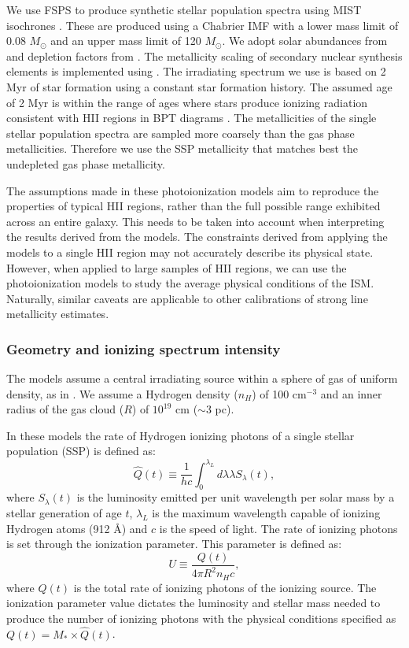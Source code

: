\documentclass[fleqn,usenatbib]{mnras}
\begin{document}
We use FSPS to produce synthetic stellar population spectra \citep{conroy2009,conroy2010} using MIST isochrones \citep{choi2016}. These are produced using a Chabrier IMF \citep{chabrier2003} with a lower mass limit of 0.08 $M_\odot$ and an upper mass limit of 120 $M_\odot$. We adopt solar abundances from \cite{grevesse2010} and depletion factors from \cite{dopita2013}. The metallicity scaling of secondary nuclear synthesis elements is implemented using \cite{vanzee1998}. The irradiating spectrum we use is based on 2 Myr of star formation using a constant star formation history. The assumed age of 2 Myr is within the range of ages where stars produce ionizing radiation consistent with HII regions in BPT diagrams \citep{byler2017}. The metallicities of the single stellar population spectra are sampled more coarsely than the gas phase metallicities. Therefore we use the SSP metallicity that matches best the undepleted gas phase metallicity.

The assumptions made in these photoionization models aim to reproduce the properties of typical HII regions, rather than the full possible range exhibited across an entire galaxy. This needs to be taken into account when interpreting the results derived from the models. The constraints derived from applying the models to a single HII region may not accurately describe its physical state. However, when applied to large samples of HII regions, we can use the  photoionization models to study the average physical conditions of the ISM. Naturally, similar caveats are applicable to other calibrations of strong line metallicity estimates.

\subsubsection{Geometry and ionizing spectrum intensity}
The models assume a central irradiating source within a sphere of gas of uniform density, as in \cite{byler2017}. We assume a Hydrogen density ($n_H$) of 100 cm$^{-3}$ and an inner radius of the gas cloud ($R$) of $10^{19}$ cm ($\sim 3$ pc). 

In these models the rate of Hydrogen ionizing photons of a single stellar population (SSP) is defined as:
\begin{equation}
    \hat{Q}(t) \equiv \frac{1}{hc} \int_0^{\lambda_L} d\lambda \lambda S_{\lambda}(t) ,
\end{equation}
where $S_{\lambda}(t)$ is the luminosity emitted per unit wavelength per solar mass by a stellar generation of age $t$, $\lambda_{L}$ is the maximum wavelength capable of ionizing Hydrogen atoms (912 \AA) and $c$ is the speed of light. The rate of ionizing photons is set through the ionization parameter. This parameter is defined as:
\begin{equation}
    U \equiv \frac{Q(t)}{4 \pi R^2 n_H c},
\end{equation}
where $Q(t)$ is the total rate of ionizing photons of the ionizing source. The ionization parameter value dictates the luminosity and stellar mass needed to produce the number of ionizing photons with the physical conditions specified as $Q(t) = M_* \times \hat{Q}(t)$. 
\end{document}
